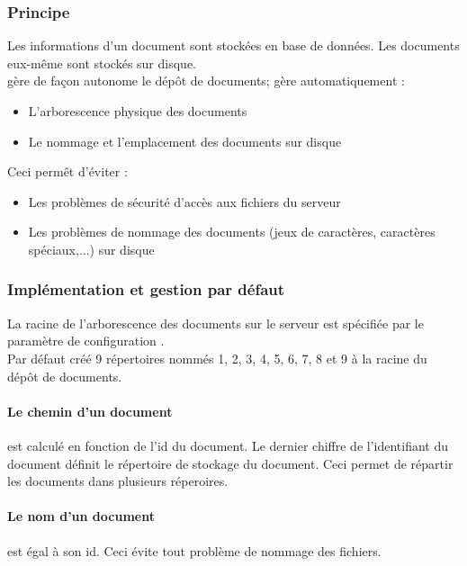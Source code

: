 \subsubsection{Principe}

Les informations d'un document sont stockées en base de données.
Les documents eux-même sont stockés sur disque.\\

\obm gère de façon autonome le dépôt de documents; \obm gère automatiquement :
\begin{itemize}
\item L'arborescence physique des documents
\item Le nommage et l'emplacement des documents sur disque
\end{itemize}
\vspace{0.3cm}

Ceci permêt d'éviter :
\begin{itemize}
\item Les problèmes de sécurité d'accès aux fichiers du serveur 
\item Les problèmes de nommage des documents (jeux de caractères, caractères spéciaux,...) sur disque
\end{itemize}


\subsubsection{Implémentation et gestion par défaut}

La racine de l'arborescence des documents sur le serveur est spécifiée par le paramètre de configuration .\\

Par défaut \obm créé 9 répertoires nommés 1, 2, 3, 4, 5, 6, 7, 8 et 9 à la racine du dépôt de documents.

\paragraph{Le chemin d'un document} est calculé en fonction de l'id du document. Le dernier chiffre de l'identifiant du document définit le répertoire de stockage du document.
Ceci permet de répartir les documents dans plusieurs réperoires.

\paragraph{Le nom d'un document} est égal à son id. Ceci évite tout problème de nommage des fichiers.

